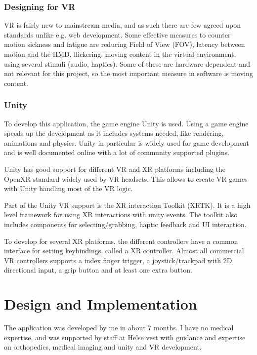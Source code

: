\documentclass[a4paper]{report}
\begin{document}
\subsection{Designing for VR}
VR is fairly new to mainstream media, and as such there are few agreed upon standards unlike e.g. web development.
Some effective measures to counter motion sickness and fatigue are reducing Field of View (FOV), latency between motion and the HMD, flickering, moving content in the virtual environment, using several stimuli (audio, haptics)\cite{chang_virtual_2020}. Some of these are hardware dependent and not relevant for this project, so the most important measure in software is moving content.

\subsection{Unity}

To develop this application, the game engine Unity is used\cite{unity}. Using a game engine speeds up the development as it includes systems needed, like rendering, animations and physics. Unity in particular is widely used for game development\cite{gameenginesonsteam} and is well documented online with a lot of community supported plugins.

Unity has good support for different VR and XR platforms\cite{unityxr} including the OpenXR standard widely used by VR headsets\cite{openxr}. This allows to create VR games with Unity handling most of the VR logic.

Part of the Unity VR support is the XR interaction Toolkit (XRTK)\cite{xrinteractiontoolkit}. It is a high level framework for using XR interactions with unity events. The toolkit also includes components for selecting/grabbing, haptic feedback and UI interaction.

To develop for several XR platforms, the different controllers have a common interface for setting keybindings, called a XR controller. Almost all commercial VR controllers supports a index finger trigger, a joystick/trackpad with 2D directional input, a grip button and at least one extra button\cite{technologies_unity_nodate}.



\chapter{Design and Implementation}\label{Design and Implementation}

The application was developed by me in about 7 months. I have no medical expertise, and was supported by staff at Helse vest with guidance and expertise on orthopedics, medical imaging and unity and VR development.
\end{document}
